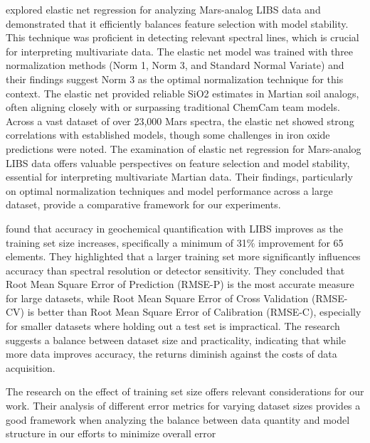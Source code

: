 \citeauthor{bai_application_2023} explored elastic net regression for analyzing Mars-analog LIBS data and demonstrated that it efficiently balances feature selection with model stability.
This technique was proficient in detecting relevant spectral lines, which is crucial for interpreting multivariate data.
The elastic net model was trained with three normalization methods (Norm 1, Norm 3, and Standard Normal Variate) and their findings suggest Norm 3 as the optimal normalization technique for this context.
The elastic net provided reliable SiO2 estimates in Martian soil analogs, often aligning closely with or surpassing traditional ChemCam team models.
Across a vast dataset of over 23,000 Mars spectra, the elastic net showed strong correlations with established models, though some challenges in iron oxide predictions were noted\cite{bai_application_2023}.
The examination of elastic net regression for Mars-analog LIBS data offers valuable perspectives on feature selection and model stability, essential for interpreting multivariate Martian data. Their findings, particularly on optimal normalization techniques and model performance across a large dataset, provide a comparative framework for our experiments.


\citeauthor{dyar_effect_2021} found that accuracy in geochemical quantification with LIBS improves as the training set size increases, specifically a minimum of 31\% improvement for 65 elements.
They highlighted that a larger training set more significantly influences accuracy than spectral resolution or detector sensitivity.
They concluded that Root Mean Square Error of Prediction (RMSE-P) is the most accurate measure for large datasets, while Root Mean Square Error of Cross Validation  (RMSE-CV) is better than Root Mean Square Error of Calibration (RMSE-C), especially for smaller datasets where holding out a test set is impractical.
The research suggests a balance between dataset size and practicality, indicating that while more data improves accuracy, the returns diminish against the costs of data acquisition\cite{dyar_effect_2021}.

The research on the effect of training set size offers relevant considerations for our work. Their analysis of different error metrics for varying dataset sizes provides a good framework when analyzing the balance between data quantity and model structure in our efforts to minimize overall error

